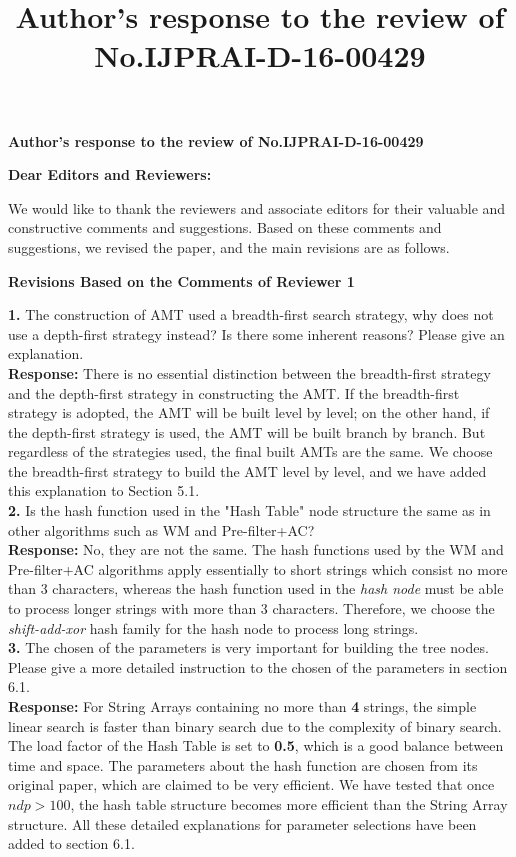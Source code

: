 \documentclass{paper}
\title{Author's response to the review of No.IJPRAI-D-16-00429}
\begin{document}
\begin{center}
{\Large \textbf{Author's response to the review of No.IJPRAI-D-16-00429\\[20pt]}}
\end{center}


\textbf{Dear Editors and Reviewers:\\}

We would like to thank the reviewers and associate editors for their
valuable and constructive comments and suggestions. Based on these
comments and suggestions, we revised the paper, and the main revisions
are as follows.\\

\begin{center}
\textbf{Revisions Based on the Comments of Reviewer 1}\\
\end{center}

\textbf{1.} The construction of AMT used a breadth-first search
strategy, why does not use a depth-first strategy instead? Is there
some inherent reasons? Please give an explanation.\\[7pt]
\noindent \textbf{Response:} There is no essential distinction between
the breadth-first strategy and the depth-first strategy in
constructing the AMT. If the breadth-first strategy is adopted, the
AMT will be built level by level; on the other hand, if the
depth-first strategy is used, the AMT will be built branch by
branch. But regardless of the strategies used, the final built AMTs
are the same. We choose the breadth-first strategy to build the AMT
level by level, and we have added this explanation to Section 5.1.\\

\textbf{2.} Is the hash function used in the "Hash Table" node
structure the same as in other algorithms such as WM and
Pre-filter+AC?\\[7pt]
\noindent \textbf{Response:} No, they are not the same. The hash
functions used by the WM and Pre-filter+AC algorithms apply
essentially to short strings which consist no more than 3 characters,
whereas the hash function used in the \emph{hash node} must be able to
process longer strings with more than 3 characters. Therefore, we
choose the \emph{shift-add-xor} hash family for the hash node to
process long
strings.\\

\textbf{3.} The chosen of the parameters is very important for
building the tree nodes. Please give a more detailed instruction to
the chosen of the parameters in section 6.1.\\[7pt]
\noindent \textbf{Response:} For String Arrays containing no more than
\textbf{4} strings, the simple linear search is faster than binary
search due to the complexity of binary search. The load factor of the
Hash Table is set to \textbf{0.5}, which is a good balance between
time and space. The parameters about the hash function are chosen from
its original paper, which are claimed to be very efficient. We have
tested that once $ndp > 100$, the hash table structure becomes more
efficient than the String Array structure. All these detailed
explanations for parameter
selections have been added to section 6.1.\\
\end{document}
